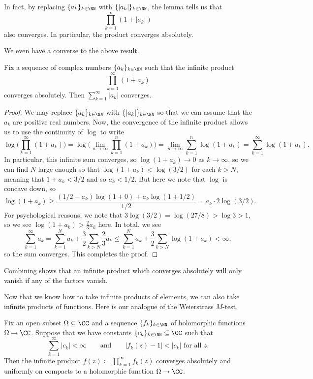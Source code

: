 \documentclass[notes.tex]{subfiles}
\begin{document}
\begin{remark} \label{rem:inf-prod-abs-conv}
	In fact, by replacing $\{a_k\}_{k\in\NN}$ with $\{|a_k|\}_{k\in\NN}$, the lemma tells us that
	\[\prod_{k=1}^\infty(1+|a_k|)\]
	also converges. In particular, the product converges absolutely.
\end{remark}
We even have a converse to the above result.
\begin{lemma} \label{lem:inf-prod-abs-conv-converse}
	Fix a sequence of complex numbers $\{a_k\}_{k\in\NN}$ such that the infinite product
	\[\prod_{k=1}^\infty(1+a_k)\]
	converges absolutely. Then $\sum_{k=1}^\infty|a_k|$ converges.
\end{lemma}
\begin{proof}
	We may replace $\{a_k\}_{k\in\NN}$ with $\{|a_k|\}_{k\in\NN}$ so that we can assume that the $a_k$ are positive real numbers. Now, the convergence of the infinite product allows us to use the continuity of $\log$ to write
	\[\log\Bigg(\prod_{k=1}^\infty(1+a_k)\Bigg)=\log\Bigg(\lim_{n\to\infty}\prod_{k=1}^n(1+a_k)\Bigg)=\lim_{n\to\infty}\sum_{k=1}^n\log(1+a_k)=\sum_{k=1}^\infty\log(1+a_k).\]
	In particular, this infinite sum converges, so $\log(1+a_k)\to0$ as $k\to\infty$, so we can find $N$ large enough so that $\log(1+a_k)<\log(3/2)$ for each $k>N$, meaning that $1+a_k<3/2$ and so $a_k<1/2$. But here we note that $\log$ is concave down, so
	\[\log(1+a_k)\ge\frac{(1/2-a_k)\log(1+0)+a_k\log(1+1/2)}{1/2}=a_k\cdot2\log(3/2).\]
	For psychological reasons, we note that $3\log(3/2)=\log(27/8)>\log3>1$, so we see $\log(1+a_k)>\frac23a_k$ here. In total, we see
	\[\sum_{k=1}^\infty a_k=\sum_{k=1}^Na_k+\frac32\sum_{k>N}\frac23a_k\le\sum_{k=1}^Na_k+\frac32\sum_{k>N}\log(1+a_k)<\infty,\]
	so the sum converges. This completes the proof.
\end{proof}
\begin{remark} \label{rem:inf-prod-abs-conv-vanishing}
	Combining  shows that an infinite product which converges absolutely will only vanish if any of the factors vanish.
\end{remark}
Now that we know how to take infinite products of elements, we can also take infinite products of functions. Here is our analogue of the Weierstrass $M$-test.
\begin{proposition} \label{prop:inf-prod-holos}
	Fix an open subset $\Omega\subseteq\CC$ and a sequence $\{f_k\}_{k\in\NN}$ of holomorphic functions $\Omega\to\CC$. Suppose that we have constants $\{c_k\}_{k\in\NN}\subseteq\CC$ such that
	\[\sum_{k=1}^\infty|c_k|<\infty\qquad\text{and}\qquad|f_k(z)-1|<|c_k|\text{ for all }z.\]
	Then the infinite product $f(z)\coloneqq\prod_{k=1}^\infty f_k(z)$ converges absolutely and uniformly on compacts to a holomorphic function $\Omega\to\CC$.
\end{proposition}
\end{document}
